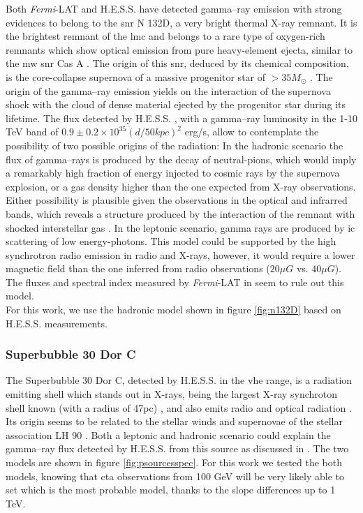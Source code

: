 \documentclass{article}
\begin{document}
    Both \textit{Fermi}-LAT and H.E.S.S. have detected gamma--ray emission with strong evidences to belong to the \gls{snr} N 132D, a very bright thermal X-ray remnant. It is the brightest remnant of the \gls{lmc} and belongs to a rare type of oxygen-rich remnants which show optical emission from pure heavy-element ejecta, similar to the \gls{mw} \gls{snr} Cas A \cite{2007N132D}. The origin of this \gls{snr}, deduced by its chemical composition, is the core-collapse supernova of a massive progenitor star of $> 35 M_{\odot}$ \cite{2007N132D}. The origin of the gamma--ray emission yields on the interaction of the supernova shock with the cloud of dense material ejected by the progenitor star during its lifetime. The flux detected by H.E.S.S. \cite{2015HESSTeVLMC}, with a gamma--ray luminosity in the 1-10 TeV band of $0.9 \pm 0.2 \times 10^{35}(d/50kpc)^2$ erg/s, allow to contemplate the possibility of two possible origins of the radiation: In the hadronic scenario the flux of gamma--rays is produced by the decay of neutral-pions, which would imply a remarkably high fraction of energy injected to cosmic rays by the supernova explosion, or a gas density higher than the one expected from X-ray observations. Either possibility is plausible given the observations in the optical and infrarred bands, which reveals a structure produced by the interaction of the remnant with shocked interstellar gas \cite{2006shockn132D}. In the leptonic scenario, gamma rays are produced by \gls{ic} scattering of low energy-photons. This model could be supported by the high synchrotron radio emission in radio and X-rays, however, it would require a lower magnetic field than the one inferred from radio observations ($20 \mu G$ vs. $40\mu G$). The fluxes and spectral index measured by \textit{Fermi}-LAT in \cite{2016LMCFermiLAT} seem to rule out this model.\\
    For this work, we use the hadronic model shown in figure \ref{fig:n132D} based on H.E.S.S. measurements. 
    
    \subsubsection{Superbubble 30 Dor C}
    
    The Superbubble 30 Dor C, detected by H.E.S.S. in the \gls{vhe} range, is a radiation emitting shell which stands out in X-rays, being the largest X-ray synchroton shell known (with a radius of 47pc) \cite{200430dorcxrays}, and also emits radio and optical radiation \cite{1985SNRsintheLMC30dorc}. Its origin seems to be related to the stellar winds and supernovae of the stellar association LH 90 \cite{198430dorLH90}. Both a leptonic and hadronic scenario could explain the gamma--ray flux detected by H.E.S.S. from this source as discussed in \cite{2015HESSTeVLMC}. The two models are shown in figure \ref{fig:psourcesspec}. For this work we tested the both models, knowing that \gls{cta} observations from 100 GeV will be very likely able to set which is the most probable model, thanks to the slope differences up to 1 TeV.
     
\end{document}
